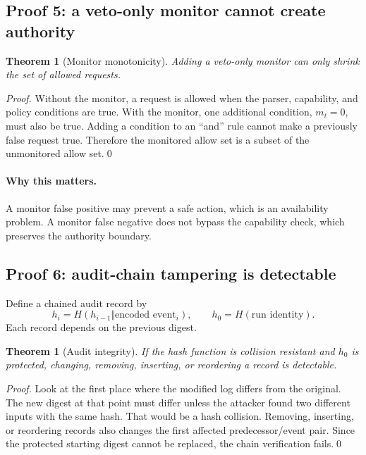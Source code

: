 \documentclass[11pt]{article}
\newtheorem{theorem}[definition]{Theorem}
\begin{document}
\subsection{Proof 5: a veto-only monitor cannot create authority}
\begin{theorem}[Monitor monotonicity]
Adding a veto-only monitor can only shrink the set of allowed requests.
\end{theorem}
\begin{proof}
Without the monitor, a request is allowed when the parser, capability, and policy conditions are true. With the monitor, one additional condition, $m_t=0$, must also be true. Adding a condition to an ``and'' rule cannot make a previously false request true. Therefore the monitored allow set is a subset of the unmonitored allow set.\qed
\end{proof}

\paragraph{Why this matters.} A monitor false positive may prevent a safe action, which is an availability problem. A monitor false negative does not bypass the capability check, which preserves the authority boundary.

\subsection{Proof 6: audit-chain tampering is detectable}
Define a chained audit record by
\begin{equation}
 h_i=H(h_{i-1}\Vert\text{encoded event}_i),\qquad h_0=H(\text{run identity}).
\end{equation}
Each record depends on the previous digest.

\begin{theorem}[Audit integrity]
If the hash function is collision resistant and $h_0$ is protected, changing, removing, inserting, or reordering a record is detectable.
\end{theorem}
\begin{proof}
Look at the first place where the modified log differs from the original. The new digest at that point must differ unless the attacker found two different inputs with the same hash. That would be a hash collision. Removing, inserting, or reordering records also changes the first affected predecessor/event pair. Since the protected starting digest cannot be replaced, the chain verification fails.\qed
\end{proof}
\end{document}
